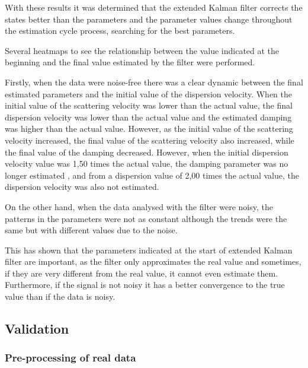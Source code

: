 \documentclass[12pt, a4paper]{article} %
\begin{document}
With these results it was determined that the extended Kalman filter corrects the states better than the parameters and the parameter values change throughout the estimation cycle process, searching for the best parameters.

Several heatmaps to see the relationship between the value indicated at the beginning and the final value estimated by the filter were performed. 

Firstly, when the data were noise-free there was a clear dynamic between the final estimated parameters and the initial value of the dispersion velocity. When the initial value of the scattering velocity was lower than the actual value, the final dispersion velocity was lower than the actual value and the estimated damping was higher than the actual value. However, as the initial value of the scattering velocity increased, the final value of the scattering velocity also increased, while the final value of the damping decreased. However, when the initial dispersion velocity value was 1,50 times the actual value, the damping parameter was no longer estimated , and from a dispersion value of 2,00 times the actual value, the dispersion velocity was also not estimated.

On the other hand, when the data analysed with the filter were noisy, the patterns in the parameters were not as constant although the trends were the same but with different values due to the noise.

This has shown that the parameters indicated at the start of extended Kalman filter are important, as the filter only approximates the real value and sometimes, if they are very different from the real value, it cannot even estimate them. Furthermore, if the signal is not noisy it has a better convergence to the true value than if the data is noisy.

\setlength{\parskip}{0mm}

\subsection{Validation}

\subsubsection{Pre-processing of real data}
\end{document}
